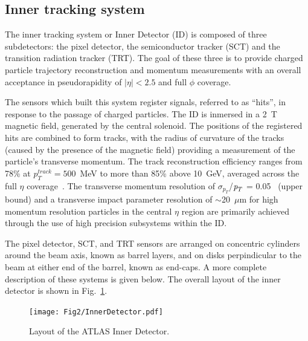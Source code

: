 \subsection{Inner tracking system}\label{atlasID}

The inner tracking system or Inner Detector (ID) is composed of three subdetectors: the pixel detector, the semiconductor tracker (SCT) and the transition radiation tracker (TRT). The goal of these three is to provide charged particle trajectory reconstruction and momentum measurements with an overall acceptance in pseudorapidity of $|\eta| < 2.5$ and full $\phi$ coverage. 

The sensors which built this system register signals, referred to as ``hits'', in response to the passage of charged particles. The ID is inmersed in a 2~T magnetic field, generated by the central solenoid. The positions of the registered hits are combined to form tracks, with the radius of curvature  of the tracks (caused by the presence of the magnetic field) providing a measurement of the particle's transverse momentum. 
The track reconstruction efficiency ranges from 78\% at $p^{track}_{T} = 500$~MeV to more than 85\% above 10~GeV, averaged across the full $\eta$ coverage~\cite{chargemultiplicity}. The transverse momentum resolution of $\sigma_{p_T}$/${\emph{p}_{T}}$ = 0.05~\cite{ATLAS-CONF-2010-009} (upper bound) and a transverse impact parameter resolution of $\sim$20~$\mu$m for high momentum resolution particles in the central $\eta$ region\cite{ATLAS-CONF-2010-070} are primarily achieved through the use of high precision subsystems within the ID.

The pixel detector, SCT, and TRT sensors are arranged on concentric cylinders around the beam axis, known as barrel layers, and on disks perpindicular to the beam at either end of the barrel, known as end-caps. A more complete description of these systems is given below. The overall layout of the inner detector is shown in Fig.~\ref{fig:figinner}. 


\begin{figure}[htbp]
  \begin{center}
      \texttt{[image: Fig2/InnerDetector.pdf]}
    \caption{Layout of the ATLAS Inner Detector.}
    \label{fig:figinner}
  \end{center}
\end{figure}


